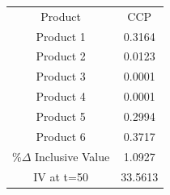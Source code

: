 \begin{tabular}{cc}
Product & CCP \\
Product 1 & 0.3164 \\
Product 2 & 0.0123 \\
Product 3 & 0.0001 \\
Product 4 & 0.0001 \\
Product 5 & 0.2994 \\
Product 6 & 0.3717 \\
$\%\Delta$ Inclusive Value & 1.0927 \\
IV at t=50 & 33.5613 \\
\end{tabular}